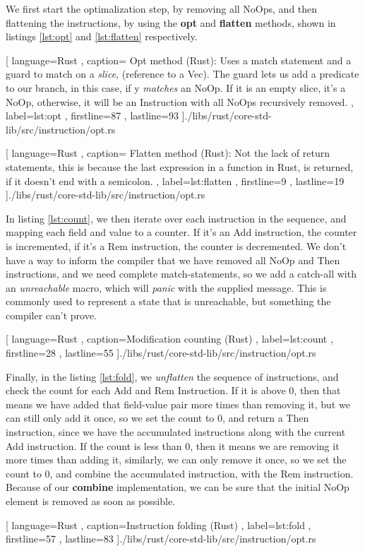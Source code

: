 We first start the optimalization step, by removing all NoOps, and then
flattening the instructions, by using the \textbf{opt} and \textbf{flatten}
methods, shown in listings \ref{lst:opt} and \ref{lst:flatten} respectively.

\begin{center}
  
   [ language=Rust
   , caption={
     Opt method (Rust): Uses a match statement and a guard to match on a
     \textit{slice}, (reference to a Vec). The guard lets us add a predicate to
     our branch, in this case, if y \textit{matches} an NoOp. If it is an empty
     slice, it's a NoOp, otherwise, it will be an Instruction with all NoOps
     recursively removed.
   }
   , label=lst:opt
   , firstline=87
   , lastline=93
   ]{./libs/rust/core-std-lib/src/instruction/opt.rs}
\end{center}

\begin{center}
  
   [ language=Rust
   , caption={
     Flatten method (Rust): Not the lack of return statements, this is because
     the last expression in a function in Rust, is returned, if it doesn't end
     with a semicolon.
   }
   , label=lst:flatten
   , firstline=9
   , lastline=19
   ]{./libs/rust/core-std-lib/src/instruction/opt.rs}
\end{center}

In listing \ref{lst:count}, we then iterate over each instruction in the
sequence, and mapping each field and value to a counter. If it's an Add
instruction, the counter is incremented, if it's a Rem instruction, the counter
is decremented. We don't have a way to inform the compiler that we have removed
all NoOp and Then instructions, and we need complete match-statements, so we add
a catch-all with an \textit{unreachable} macro, which will \textit{panic} with
the supplied message. This is commonly used to represent a state that is
unreachable, but something the compiler can't prove.

\begin{center}
  
   [ language=Rust
   , caption={Modification counting (Rust)}
   , label=lst:count
   , firstline=28
   , lastline=55
   ]{./libs/rust/core-std-lib/src/instruction/opt.rs}
\end{center}

Finally, in the listing \ref{lst:fold}, we \textit{unflatten} the sequence of
instructions, and check the count for each Add and Rem Instruction. If it is
above $0$, then that means we have added that field-value pair more times than
removing it, but we can still only add it once, so we set the count to $0$, and
return a Then instruction, since we have the accumulated instructions along with
the current Add instruction. If the count is less than $0$, then it means we are
removing it more times than adding it, similarly, we can only remove it once, so
we set the count to $0$, and combine the accumulated instruction, with the Rem
instruction. Because of our \textbf{combine} implementation, we can be sure that
the initial NoOp element is removed as soon as possible.

\begin{center}
  
   [ language=Rust
   , caption={Instruction folding (Rust)}
   , label=lst:fold
   , firstline=57
   , lastline=83
   ]{./libs/rust/core-std-lib/src/instruction/opt.rs}
\end{center}
